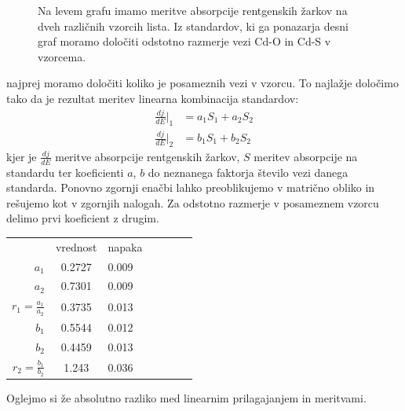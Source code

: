 \documentclass[slovene,11pt,a4paper]{article}
\numberwithin{equation}{section} %
\numberwithin{figure}{section} %
\numberwithin{table}{section} %
\begin{document}
\begin{figure}[ht]
\caption{Na levem grafu imamo meritve absorpcije rentgenskih žarkov na dveh različnih vzorcih lista. Iz standardov, ki ga ponazarja desni graf moramo določiti odstotno razmerje vezi Cd-O in Cd-S v vzorcema. }
\end{figure}

najprej moramo določiti koliko je posameznih vezi v vzorcu. To najlažje določimo tako da je rezultat meritev linearna kombinacija standardov:
\begin{equation}
\begin{aligned}
\frac{dj}{dE} \Big|_1 &= a_1 S_1 + a_2 S_2 \\
\frac{dj}{dE} \Big|_2 &= b_1 S_1 + b_2 S_2
\end{aligned}
\end{equation}
kjer je $\frac{dj}{dE}$ meritve absorpcije rentgenskih žarkov, $S$ meritev absorpcije na standardu ter koeficienti $a$, $b$ do neznanega faktorja število vezi danega standarda. Ponovno zgornji enačbi lahko preoblikujemo v matrično obliko in rešujemo kot v zgornjih nalogah. Za odstotno razmerje v posameznem vzorcu delimo prvi koeficient z drugim. 

  \begin{center}
    \begin{tabular}{r|c|lcr|c|l}
      &vrednost &napaka\\
      \cline{1-3}
      $a_1$  &      0.2727    &       0.009\\
      $a_2$  &      0.7301    &       0.009\\
      $r_1= \frac{a_1}{a_2}$  &      0.3735    &       0.013\\
      $b_1$ &      0.5544    &       0.012\\
      $b_2$  &      0.4459    &       0.013\\
       $r_2= \frac{b_1}{b_2}$  &      1.243    &       0.036
    \end{tabular}
  \end{center}

Oglejmo si že absolutno razliko med linearnim prilagajanjem in meritvami.
\end{document}
